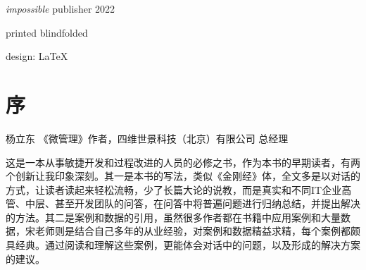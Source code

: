 \documentclass{book}        %
\date{}
\begin{document}
\begin{titlepage}\thispagestyle{empty} \vspace*{3em}{\centering\Huge A++ 敏捷开发小手册 \par}\clearpage
\newpage \thispagestyle{empty} \mbox{} \cleardoublepage
\thispagestyle{empty} \cleardoublepage

\thispagestyle{empty} \vspace*{\fill} \parbox{.8\textwidth}{\raggedright \scriptsize
\textit{impossible} publisher 2022

printed blindfolded

design: \LaTeX
}
\end{titlepage}
\clearpage \thispagestyle{empty}\cleardoublepage
\newpage %


\tableofcontents %


\chapter*{序} %


杨立东 《微管理》作者，四维世景科技（北京）有限公司 总经理

这是一本从事敏捷开发和过程改进的人员的必修之书，作为本书的早期读者，有两个创新让我印象深刻。其一是本书的写法，类似《金刚经》体，全文多是以对话的方式，让读者读起来轻松流畅，少了长篇大论的说教，而是真实和不同IT企业高管、中层、甚至开发团队的问答，在问答中将普遍问题进行归纳总结，并提出解决的方法。其二是案例和数据的引用，虽然很多作者都在书籍中应用案例和大量数据，宋老师则是结合自己多年的从业经验，对案例和数据精益求精，每个案例都颇具经典。通过阅读和理解这些案例，更能体会对话中的问题，以及形成的解决方案的建议。
\end{document}
